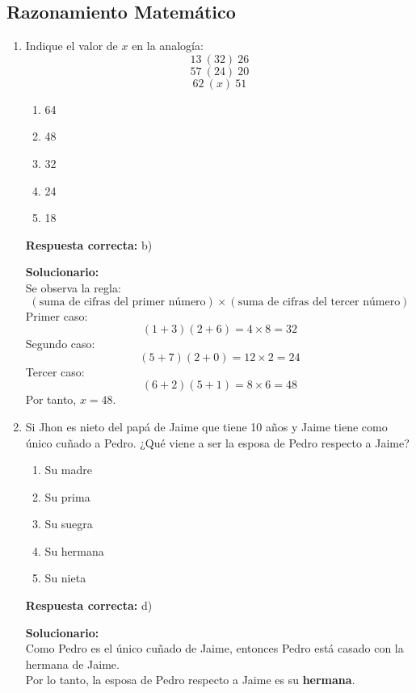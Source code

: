 \subsection*{Razonamiento Matemático}

\begin{enumerate}
	
	\item Indique el valor de \(x\) en la analogía:
	\[
	13\ (32)\ 26
	\]
	\[
	57\ (24)\ 20
	\]
	\[
	62\ (x)\ 51
	\]
	\begin{enumerate}[label=\alph*)]
		\item 64
		\item 48
		\item 32
		\item 24
		\item 18
	\end{enumerate}
	\textbf{Respuesta correcta:} b)
	
	\vspace{2mm}
	\textbf{Solucionario:}\\
	Se observa la regla:
	\[
	(\text{suma de cifras del primer número}) \times (\text{suma de cifras del tercer número})
	\]
	Primer caso:
	\[
	(1+3)(2+6)=4\times 8=32
	\]
	Segundo caso:
	\[
	(5+7)(2+0)=12\times 2=24
	\]
	Tercer caso:
	\[
	(6+2)(5+1)=8\times 6=48
	\]
	Por tanto, \(\boxed{x=48}\).
	
	\vspace{6mm}
	
	\item Si Jhon es nieto del papá de Jaime que tiene 10 años y Jaime tiene como único cuñado a Pedro. ¿Qué viene a ser la esposa de Pedro respecto a Jaime?
\begin{enumerate}[label=\alph*)]
	\item Su madre
	\item Su prima
	\item Su suegra
	\item Su hermana
	\item Su nieta
\end{enumerate}
\textbf{Respuesta correcta:} d)

	\vspace{2mm}
\textbf{Solucionario:}\\

Como Pedro es el único cuñado de Jaime, entonces Pedro está casado con la hermana de Jaime.\\
Por lo tanto, la esposa de Pedro respecto a Jaime es su \textbf{hermana}.

\begin{center}
	\begin{tikzpicture}[x=2.2cm,y=2cm]
		

\end{tikzpicture}
\end{center}
\end{enumerate}

